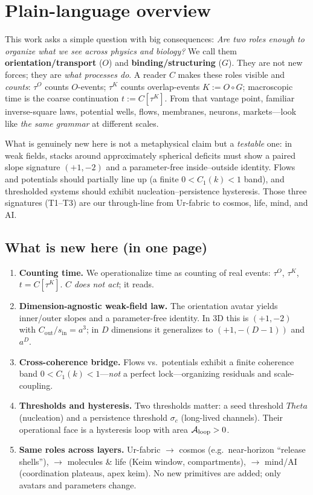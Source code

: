 \documentclass[12pt,a4paper,oneside]{scrreprt}
\def\Theta{Theta}%
\begin{document}
\section*{Plain-language overview}
This work asks a simple question with big consequences: \emph{Are two roles enough to organize what we see across physics and biology?} 
We call them \textbf{orientation/transport} ($O$) and \textbf{binding/structuring} ($G$). 
They are not new forces; they are \emph{what processes do}. 
A reader $C$ makes these roles visible and \emph{counts}: $\tau^O$ counts $O$-events; $\tau^K$ counts overlap-events $K:=O\!\circ G$; macroscopic time is the coarse continuation $t:=C[\tau^K]$. 
From that vantage point, familiar inverse-square laws, potential wells, flows, membranes, neurons, markets—look like \emph{the same grammar} at different scales.

What is genuinely new here is not a metaphysical claim but a \emph{testable} one: in weak fields, stacks around approximately spherical deficits must show a paired slope signature $(+1,-2)$ and a parameter-free inside–outside identity. 
Flows and potentials should partially line up (a finite $0<C_1(k)<1$ band), and thresholded systems should exhibit nucleation–persistence hysteresis. 
Those three signatures (T1–T3) are our through-line from Ur-fabric to cosmos, life, mind, and AI.

\subsection*{What is new here (in one page)}
\begin{enumerate}
  \item \textbf{Counting time.} We operationalize time as counting of real events: $\tau^O$, $\tau^K$, $t=C[\tau^K]$. $C$ \emph{does not act}; it reads.
  \item \textbf{Dimension-agnostic weak-field law.} The orientation avatar yields inner/outer slopes and a parameter-free identity. In 3D this is $(+1,-2)$ with $C_{\mathrm{out}}/s_{\mathrm{in}}=a^3$; in $D$ dimensions it generalizes to $(+1,-(D\!-\!1))$ and $a^{D}$.
  \item \textbf{Cross-coherence bridge.} Flows vs.\ potentials exhibit a finite coherence band $0<C_1(k)<1$—\emph{not} a perfect lock—organizing residuals and scale-coupling.
  \item \textbf{Thresholds and hysteresis.} Two thresholds matter: a seed threshold $\Theta$ (nucleation) and a persistence threshold $\sigma_c$ (long-lived channels). Their operational face is a hysteresis loop with area $\mathcal A_{\rm loop}>0$.
  \item \textbf{Same roles across layers.} Ur-fabric $\to$ cosmos (e.g.\ near-horizon “release shells”), $\to$ molecules \& life (Keim window, compartments), $\to$ mind/AI (coordination plateaus, apex keim). No new primitives are added; only avatars and parameters change.
\end{enumerate}
\end{document}
